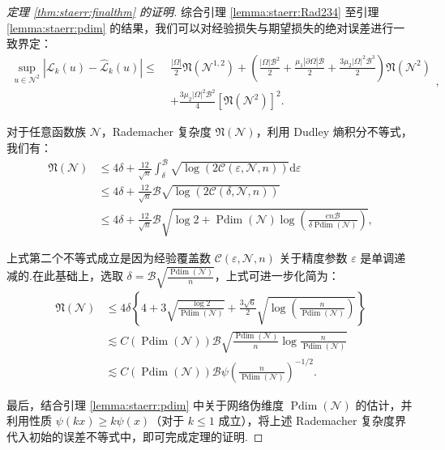 \begin{proof}[定理 \ref{thm:staerr:finalthm} 的证明]
综合引理 \ref{lemma:staerr:Rad234} 至引理 \ref{lemma:staerr:pdim} 的结果，我们可以对经验损失与期望损失的绝对误差进行一致界定：
$$\begin{aligned}
\sup _{u \in \mathcal{N}^{2}}\left|\mathcal{L}_{k}(u)-\widehat{\mathcal{L}}_{k}(u)\right| \leq\;& \frac{|\Omega|}{2}\mathfrak{N}\left(\mathcal{N}^{1,2}\right) +
\left(\frac{|\Omega|\mathcal{B}^{2}}{2}+\frac{\mu_{1}|\partial\Omega|\mathcal{B}}{2}+\frac{3\mu_{2}|\Omega|^{2}\mathcal{B}^{3}}{2}\right)\mathfrak{N}\left(\mathcal{N}^{2}\right)\\
&+\frac{3\mu_{2}|\Omega|^{2}\mathcal{B}^{2}}{4}\left[\mathfrak{N}\left(\mathcal{N}^{2}\right)\right]^{2}.
\end{aligned},$$

对于任意函数族 $\mathcal{N}$，Rademacher 复杂度 $\mathfrak{N}\left(\mathcal{N}\right)$，利用 Dudley 熵积分不等式，我们有：
$$\begin{aligned}
\mathfrak{N}\left(\mathcal{N}\right) &\leq 4 \delta+\frac{12}{\sqrt{n}} \int_{\delta}^{\mathcal{B}} \sqrt{\log (2 \mathcal{C}(\varepsilon, \mathcal{N}, n))} \mathrm{d} \varepsilon\\
&\leq 4 \delta+\frac{12}{\sqrt{n}} \mathcal{B} \sqrt{\log (2 \mathcal{C}(\delta, \mathcal{N}, n))}\\
&\leq 4 \delta+\frac{12}{\sqrt{n}} \mathcal{B} \sqrt{\log 2 + \operatorname{Pdim}(\mathcal{N})\log\left(\frac{e n \mathcal{B}}{\delta \operatorname{Pdim}(\mathcal{N})}\right)},
\end{aligned}$$

上式第二个不等式成立是因为经验覆盖数 $\mathcal{C}(\varepsilon, \mathcal{N}, n)$ 关于精度参数 $\varepsilon$ 是单调递减的.在此基础上，选取 $\delta=\mathcal{B}\sqrt{\frac{\operatorname{Pdim}(\mathcal{N})}{n}}$，上式可进一步化简为：
$$\begin{aligned}
\mathfrak{N}\left(\mathcal{N}\right) &\leq 4\delta\left\{ 4+ 3\sqrt{\frac{\log 2}{\operatorname{Pdim}(\mathcal{N})}} +\frac{3\sqrt{6}}{2}\sqrt{\log\left(\frac{n}{ \operatorname{Pdim}(\mathcal{N})}\right)}\right\}\\
&\lesssim C(\operatorname{Pdim}(\mathcal{N})) \mathcal{B}\sqrt{\frac{\operatorname{Pdim}(\mathcal{N})}{n}\log\frac{n}{\operatorname{Pdim}(\mathcal{N})}}\\
&\lesssim C(\operatorname{Pdim}(\mathcal{N})) \mathcal{B}\psi\left(\frac{n}{\operatorname{Pdim}(\mathcal{N})}\right)^{-1/2}.
\end{aligned}$$

最后，结合引理 \ref{lemma:staerr:pdim} 中关于网络伪维度 $\operatorname{Pdim}(\mathcal{N})$ 的估计，并利用性质 $\psi(kx)\geq k\psi(x)$（对于 $k\leq 1$ 成立），将上述 Rademacher 复杂度界代入初始的误差不等式中，即可完成定理的证明.
\end{proof}


